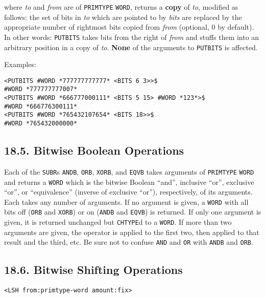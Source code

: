 \documentclass[a4paper,]{article}
\begin{document}
 where \emph{to} and \emph{from} are of \texttt{PRIMTYPE} \texttt{WORD}, returns a
\textbf{copy} of \emph{to}, modified as follows: the set of bits in \emph{to} which are pointed to by \emph{bits} are
replaced by the appropriate number of rightmost bits copied from \emph{from} (optional, 0 by default). In other words:
\texttt{PUTBITS} takes bits from the right of \emph{from} and stuffs them into an arbitrary position in a copy of
\emph{to}. \textbf{None} of the arguments to \texttt{PUTBITS} is affected.

Examples:

\begin{verbatim}
<PUTBITS #WORD *777777777777* <BITS 6 3>>$
#WORD *777777777007*
<PUTBITS #WORD *666777000111* <BITS 5 15> #WORD *123*>$
#WORD *666776300111*
<PUTBITS #WORD *765432107654* <BITS 18>>$
#WORD *765432000000*
\end{verbatim}

\subsection{18.5. Bitwise Boolean Operations}\label{bitwise-boolean-operations}

Each of the \texttt{SUBR}s \texttt{ANDB}, \texttt{ORB},
\texttt{XORB}, and \texttt{EQVB} takes arguments of
\texttt{PRIMTYPE} \texttt{WORD} and returns a \texttt{WORD} which is the bitwise Boolean ``and'', inclusive ``or'',
exclusive ``or'', or ``equivalence'' (inverse of exclusive ``or''), respectively, of its arguments. Each takes any number
of arguments. If no argument is given, a \texttt{WORD} with all bits off (\texttt{ORB} and \texttt{XORB}) or on
(\texttt{ANDB} and \texttt{EQVB}) is returned. If only one argument is given, it is returned unchanged but \texttt{CHTYPE}d
to a \texttt{WORD}. If more than two arguments are given, the operator is applied to the first two, then applied to that
result and the third, etc. Be sure not to confuse \texttt{AND} and \texttt{OR} with \texttt{ANDB} and \texttt{ORB}.

\subsection{18.6. Bitwise Shifting Operations}\label{bitwise-shifting-operations}

\begin{verbatim}
<LSH from:primtype-word amount:fix>
\end{verbatim}
\end{document}
